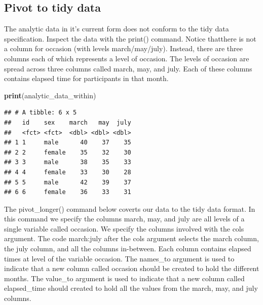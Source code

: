 \documentclass[
]{krantz}
\makeatletter
\newenvironment{Shaded}{\begin{snugshade}}{\end{snugshade}}
\newcommand{\DataTypeTok}[1]{\textcolor[rgb]{0.27,0.27,0.27}{#1}}
\newcommand{\KeywordTok}[1]{\textcolor[rgb]{0.27,0.27,0.27}{\textbf{#1}}}
\newcommand{\NormalTok}[1]{#1}
\newcommand{\OperatorTok}[1]{\textcolor[rgb]{0.43,0.43,0.43}{\textbf{#1}}}
\newcommand{\StringTok}[1]{\textcolor[rgb]{0.5,0.5,0.5}{#1}}
\newenvironment{kframe}{%
\medskip{}
\setlength{\fboxsep}{.8em}
 \def\at@end@of@kframe{}%
 \ifinner\ifhmode%
  \def\at@end@of@kframe{\end{minipage}}%
  \begin{minipage}{\columnwidth}%
 \fi\fi%
 \def\FrameCommand##1{\hskip\@totalleftmargin \hskip-\fboxsep
 \colorbox{shadecolor}{##1}\hskip-\fboxsep
     \hskip-\linewidth \hskip-\@totalleftmargin \hskip\columnwidth}%
 \MakeFramed {\advance\hsize-\width
   \@totalleftmargin\z@ \linewidth\hsize
   \@setminipage}}%
 {\par\unskip\endMakeFramed%
 \at@end@of@kframe}
\renewenvironment{Shaded}{\begin{kframe}}{\end{kframe}}
\makeatother
\begin{document}
\hypertarget{pivot-to-tidy-data}{%
\subsection{Pivot to tidy data}\label{pivot-to-tidy-data}}

The analytic data in it's current form does not conform to the tidy data specification. Inspect the data with the print() command. Notice thatthere is not a column for occasion (with levels march/may/july). Instead, there are three columns each of which represents a level of occasion. The levels of occasion are spread across three columns called march, may, and july. Each of these columns contains elapsed time for participants in that month.

\begin{Shaded}
\begin{Highlighting}[]
\KeywordTok{print}\NormalTok{(analytic_data_within)}
\end{Highlighting}
\end{Shaded}

\begin{verbatim}
## # A tibble: 6 x 5
##   id    sex    march   may  july
##   <fct> <fct>  <dbl> <dbl> <dbl>
## 1 1     male      40    37    35
## 2 2     female    35    32    30
## 3 3     male      38    35    33
## 4 4     female    33    30    28
## 5 5     male      42    39    37
## 6 6     female    36    33    31
\end{verbatim}

The pivot\_longer() command below coverts our data to the tidy data format. In this command we specify the columns march, may, and july are all levels of a single variable called occasion. We specify the columns involved with the cols argument. The code march:july after the cols argument selects the march column, the july column, and all the columns in-between. Each column contains elapsed times at level of the variable occasion. The names\_to argument is used to indicate that a new column called occasion should be created to hold the different months. The value\_to argument is used to indicate that a new column called elapsed\_time should created to hold all the values from the march, may, and july columns.

\begin{Shaded}
\end{Shaded}
\end{document}
